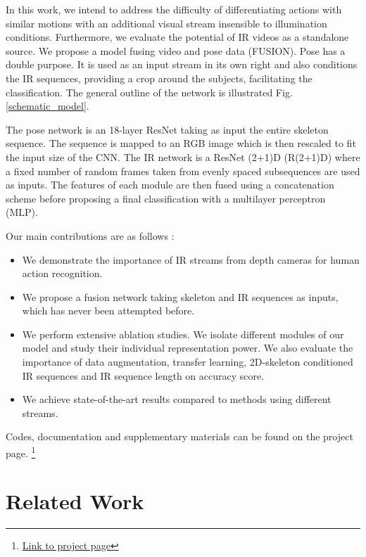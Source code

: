 \documentclass[letterpaper, 10 pt, conference]{ieeeconf}
\begin{document}
In this work, we intend to address the difficulty of differentiating actions with similar motions with an additional visual stream insensible to illumination conditions. Furthermore, we evaluate the potential of IR videos as a standalone source. We propose a model fusing video and pose data (FUSION). Pose has a double purpose. It is used as an input stream in its own right and also conditions the IR sequences, providing a crop around the subjects, facilitating the classification. The general outline of the network is illustrated Fig. \ref{schematic_model}. 

The pose network is an 18-layer ResNet \cite{he2016deep} taking as input the entire skeleton sequence. The sequence is mapped to an RGB image which is then rescaled to fit the input size of the CNN. The IR network is a ResNet (2+1)D (R(2+1)D) \cite{tran2018closer} where a fixed number of random frames taken from evenly spaced subsequences are used as inputs. The features of each module are then fused using a concatenation scheme before proposing a final classification with a multilayer perceptron (MLP). 

Our main contributions are as follows :

\begin{itemize}
    \item We demonstrate the importance of IR streams from depth cameras for human action recognition.
    \item We propose a fusion network taking skeleton and IR sequences as inputs, which has never been attempted before. 
    \item We perform extensive ablation studies. We isolate different modules of our model and study their individual representation power. We also evaluate the importance of data augmentation, transfer learning, 2D-skeleton conditioned IR sequences and IR sequence length on accuracy score.
    \item We achieve state-of-the-art results compared to methods using different streams.
\end{itemize}{}

Codes, documentation and supplementary materials can be found on the project page. \footnote{\href{https://github.com/adeboissiere/FUSION-human-action-recognition}{Link to project page}}


\section{Related Work}
\end{document}
